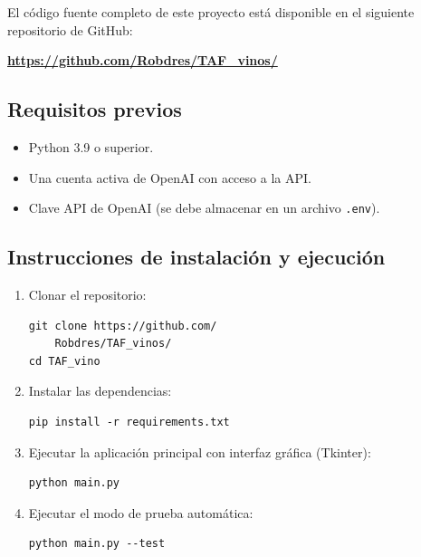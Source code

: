 \documentclass[conference]{IEEEtran}
\begin{document}
El código fuente completo de este proyecto está disponible en el siguiente repositorio de GitHub:

\begin{center}
\textbf{\url{https://github.com/Robdres/TAF_vinos/}}
\end{center}

\subsection{Requisitos previos}

\begin{itemize}
    \item Python 3.9 o superior.
    \item Una cuenta activa de OpenAI con acceso a la API.
    \item Clave API de OpenAI (se debe almacenar en un archivo \texttt{.env}).
\end{itemize}

\subsection{Instrucciones de instalación y ejecución}

\begin{enumerate}
    \item Clonar el repositorio:
    \begin{verbatim}
git clone https://github.com/
    Robdres/TAF_vinos/
cd TAF_vino
    \end{verbatim}

    \item Instalar las dependencias:
    \begin{verbatim}
pip install -r requirements.txt
    \end{verbatim}

    \item Ejecutar la aplicación principal con interfaz gráfica (Tkinter):
    \begin{verbatim}
python main.py
    \end{verbatim}

    \item Ejecutar el modo de prueba automática:
    \begin{verbatim}
python main.py --test
    \end{verbatim}

\end{enumerate}
\end{document}
